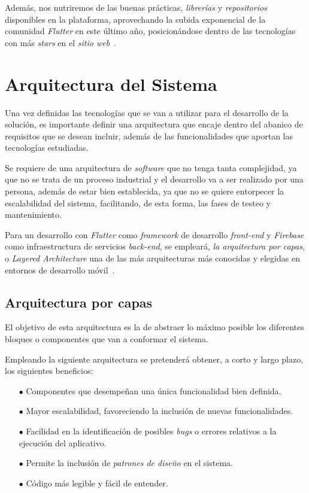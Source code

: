 Además, nos nutriremos de las buenas prácticas, \textit{librerías} y \textit{repositorios} disponibles en la plataforma,
aprovechando la subida exponencial de la comunidad \textit{Flutter} en este último año, posicionándose
dentro de las tecnologías con más \textit{stars} en el \textit{sitio web}~\cite{gittracker}.

\section{Arquitectura del Sistema}
Una vez definidas las tecnologías que se van a utilizar para el desarrollo de la solución, es importante definir una 
arquitectura que encaje dentro del abanico de requisitos que se desean incluir, además de las funcionalidades que
aportan las tecnologías estudiadas.

Se requiere de una arquitectura de \textit{software} que no tenga tanta complejidad, ya que no se trata de un
proceso industrial y el desarrollo va a ser realizado por una persona, además de estar bien establecida, ya que
no se quiere entorpecer la escalabilidad del sistema, facilitando, de esta forma, las fases de testeo y mantenimiento.

Para un desarrollo con \textit{Flutter} como \textit{framework} de desarrollo \textit{front-end} y \textit{Firebase}
como infraestructura de servicios \textit{back-end}, se empleará, \textit{la arquitectura por capas}, o 
\textit{Layered Architecture} 
una de las más arquitecturas más conocidas y elegidas en entornos de desarrollo móvil~\cite{7053865}.

\subsection{Arquitectura por capas}
El objetivo de esta arquitectura es la de abstraer lo máximo posible los diferentes bloques o componentes que van a
conformar el sistema. 

Empleando la siguiente arquitectura se pretenderá obtener, a corto y largo plazo,  los siguientes beneficios:

\begin{itemize}
  \item[$\bullet$] Componentes que desempeñan una única funcionalidad bien definida.
  \item[$\bullet$] Mayor escalabilidad, favoreciendo la inclusión de nuevas funcionalidades.
  \item[$\bullet$] Facilidad en la identificación de posibles \textit{bugs} o errores relativos a la
  ejecución del aplicativo.
  \item[$\bullet$] Permite la inclusión de \textit{patrones de diseño} en el sistema.
  \item[$\bullet$] Código más legible y fácil de entender.
\end{itemize}

